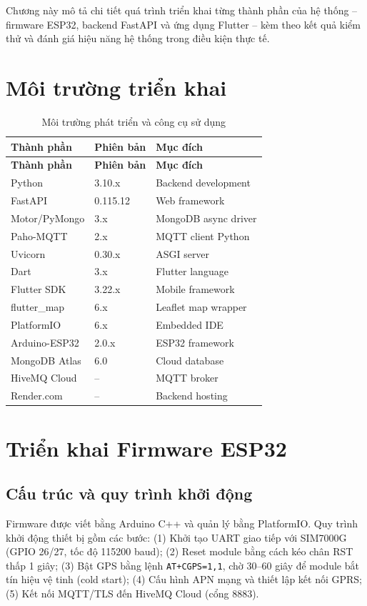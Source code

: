 \documentclass[../DoAn.tex]{subfiles}
\begin{document}
Chương này mô tả chi tiết quá trình triển khai từng thành phần của hệ thống -- firmware ESP32, backend FastAPI và ứng dụng Flutter -- kèm theo kết quả kiểm thử và đánh giá hiệu năng hệ thống trong điều kiện thực tế.

\section{Môi trường triển khai}

\begin{longtable}{L{3.5cm}L{3cm}L{6.8cm}}
\caption{Môi trường phát triển và công cụ sử dụng}\\
\toprule
\textbf{Thành phần} & \textbf{Phiên bản} & \textbf{Mục đích}\\
\midrule
\endfirsthead
\toprule
\textbf{Thành phần} & \textbf{Phiên bản} & \textbf{Mục đích}\\
\midrule
\endhead
Python & 3.10.x & Backend development\\
FastAPI & 0.115.12 & Web framework\\
Motor/PyMongo & 3.x & MongoDB async driver\\
Paho-MQTT & 2.x & MQTT client Python\\
Uvicorn & 0.30.x & ASGI server\\
\midrule
Dart & 3.x & Flutter language\\
Flutter SDK & 3.22.x & Mobile framework\\
flutter\_map & 6.x & Leaflet map wrapper\\
\midrule
PlatformIO & 6.x & Embedded IDE\\
Arduino-ESP32 & 2.0.x & ESP32 framework\\
\midrule
MongoDB Atlas & 6.0 & Cloud database\\
HiveMQ Cloud & -- & MQTT broker\\
Render.com & -- & Backend hosting\\
\bottomrule
\end{longtable}

\section{Triển khai Firmware ESP32}

\subsection{Cấu trúc và quy trình khởi động}

Firmware được viết bằng Arduino C++ và quản lý bằng PlatformIO. Quy trình khởi động thiết bị gồm các bước: (1) Khởi tạo UART giao tiếp với SIM7000G (GPIO 26/27, tốc độ 115200 baud); (2) Reset module bằng cách kéo chân RST thấp 1 giây; (3) Bật GPS bằng lệnh \texttt{AT+CGPS=1,1}, chờ 30--60 giây để module bắt tín hiệu vệ tinh (cold start); (4) Cấu hình APN mạng và thiết lập kết nối GPRS; (5) Kết nối MQTT/TLS đến HiveMQ Cloud (cổng 8883).
\end{document}
